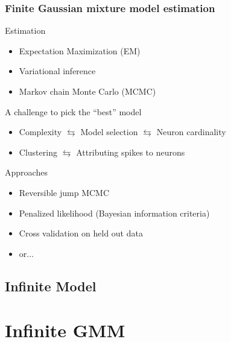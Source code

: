 \documentclass{beamer}
\begin{document}
\begin{frame}
\frametitle{ Finite Gaussian mixture model estimation}
\begin{block}{Estimation}
\begin{itemize}
\item Expectation Maximization (EM)
\item Variational inference
\item Markov chain Monte Carlo (MCMC)
\end{itemize}
\end{block}
\begin{block}{A challenge to pick the ``best'' model}
\begin{itemize}
\item Complexity $\leftrightarrows$ Model selection $\leftrightarrows$ Neuron cardinality
\item Clustering $\leftrightarrows$ Attributing spikes to neurons
\end{itemize}
\end{block}
\begin{block}{Approaches}
\begin{itemize}
\item Reversible jump MCMC
\item Penalized likelihood (Bayesian information criteria)
\item Cross validation on held out data
\item or...
\end{itemize}
\end{block}
\end{frame}
\subsection{Infinite Model}

\section{Infinite GMM}
\end{document}
